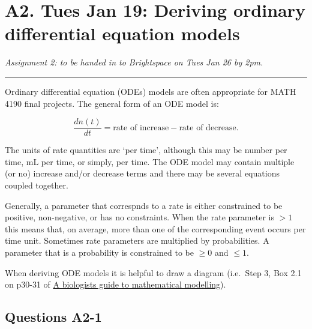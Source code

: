 \documentclass[]{book}
\begin{document}
\chapter{A2. Tues Jan 19: Deriving ordinary differential equation
models}\label{a2.-tues-jan-19-deriving-ordinary-differential-equation-models}

\emph{Assignment 2: to be handed in to Brightspace on Tues Jan 26 by
2pm.}

\begin{center}\rule{0.5\linewidth}{0.5pt}\end{center}

Ordinary differential equation (ODEs) models are often appropriate for
MATH 4190 final projects. The general form of an ODE model is:

\begin{equation}\label{eq:genCT}
\frac{dn(t)}{dt} = \mbox{rate of increase} - \mbox{rate of decrease}.
\end{equation}

The units of rate quantities are `per time', although this may be number
per time, mL per time, or simply, per time. The ODE model may contain
multiple (or no) increase and/or decrease terms and there may be several
equations coupled together.

Generally, a parameter that correspnds to a rate is either constrained
to be positive, non-negative, or has no constraints. When the rate
parameter is \(>1\) this means that, on average, more than one of the
corresponding event occurs per time unit. Sometimes rate parameters are
multiplied by probabilities. A parameter that is a probability is
constrained to be \(\geq 0\) and \(\leq 1\).

When deriving ODE models it is helpful to draw a diagram (i.e.~Step 3,
Box 2.1 on p30-31 of
\href{https://ebookcentral-proquest-com.qe2a-proxy.mun.ca/lib/MUN/detail.action?docID=768551}{A
biologists guide to mathematical modelling}).

\section{Questions A2-1}\label{questions-a2-1}
\end{document}
